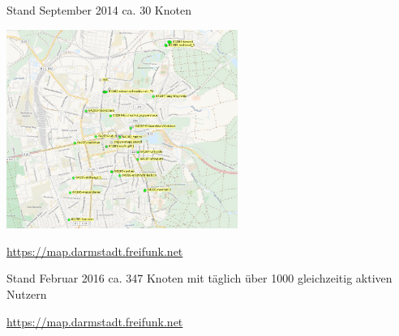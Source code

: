 \documentclass[10pt]{beamer}
\begin{document}
    \begin{frame}{Stand September 2014}
      ca. 30 Knoten
      \begin{center}
        \vfill
        \begin{center}
          \includegraphics[height=6.5cm]{images/darmstadt-map}
        \end{center}
        \vfill
        \url{https://map.darmstadt.freifunk.net}
      \end{center}
    \end{frame}

    \begin{frame}{Stand Februar 2016}
      ca. 347 Knoten mit täglich über 1000 gleichzeitig aktiven Nutzern
      \begin{center}
        \vfill
        \begin{center}
        \end{center}
        \vfill
        \url{https://map.darmstadt.freifunk.net}
      \end{center}
    \end{frame}
\end{document}
